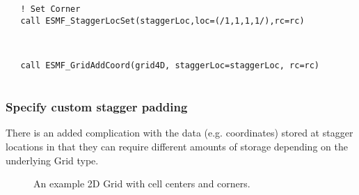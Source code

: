 
 \begin{verbatim}


   ! Set Corner
   call ESMF_StaggerLocSet(staggerLoc,loc=(/1,1,1,1/),rc=rc)
 
\end{verbatim}
 

 \begin{verbatim}

   call ESMF_GridAddCoord(grid4D, staggerLoc=staggerLoc, rc=rc)
 
\end{verbatim}
 

  \subsubsection{Specify custom stagger padding}
  \label{sec:usage:staggerpadding:adv}
  
  There is an added complication with the data (e.g. coordinates) stored at stagger locations in
  that they can require different amounts of storage depending
  on the underlying Grid type.
  
  \begin{center}
  \begin{figure}
  \center
  \caption{An example 2D Grid with cell centers and corners.}
  \label{fig:gridcellsandcorners}
  \end{figure}
  \end{center}
  
